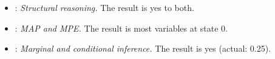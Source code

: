\begingroup\footnotesize\raggedright
\begin{itemize}[nosep,leftmargin=*]
\item {}: \emph{Structural reasoning.}  The result is yes to both.
\item {}: \emph{MAP and MPE.}  The result is most variables at state 0.
\item {}: \emph{Marginal and conditional inference.}  The result is yes (actual: 0.25).
\end{itemize}
\endgroup
